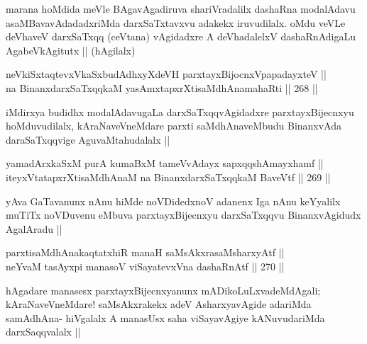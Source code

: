 \begin{artha}
marana hoMdida meVle BAgavAgadiruva shariVradalilx dashaRna modalAdavu asaMBavavAdadadxriMda darxSaTxtavxvu adakekx iruvudilalx. oMdu veVLe deVhaveV darxSaTxqq (ceVtana) vAgidadxre A deVhadalelxV dashaRnAdigaLu AgabeVkAgitutx || (hAgilalx)
\end{artha}

\begin{shl}
neVkiSxtaqtevxV\s kaSxbudAdhxyXdeVH parxtayxBijocnxVpapadayxteV || \\
na BinanxdarxSaTxqqkaM yasAmxtapxrXtisaMdhAnamahaRti ||  268 ||  
\end{shl}

\begin{artha}
iMdirxya budidhx modalAdavugaLa darxSaTxqqvAgidadxre parxtayxBijecnxyu hoMduvudilalx, kAraNaveVneMdare parxti saMdhAnaveMbudu BinanxvAda daraSaTxqqvige AguvaMtahudalalx ||
\end{artha}


\begin{shl}
yamadArxkaSxM purA kumaBxM tameVvAdayx sapxqqshAmayxhamf || \\
iteyxVtatapxrXtisaMdhAnaM na BinanxdarxSaTxqqkaM BaveVtf ||  269 ||  
\end{shl}

\begin{artha}
yAva GaTavanunx nAnu hiMde noVDidedxnoV adanenx Iga nAnu keYyalilx muTiTx noVDuvenu eMbuva parxtayxBijecnxyu darxSaTxqqvu BinanxvAgidudx AgalAradu ||  
\end{artha}


\begin{shl}
parxtisaMdhAnakaqtatxhiR manaH saMsAkxrasaMsharxyAtf ||  \\
neYvaM tasAyxpi manasoV viSayatevxVna dashaRnAtf ||  270 ||  
\end{shl}

\begin{artha}
hAgadare manasesx parxtayxBijecnxyanunx mADikoLuLxvadeMdAgali; kAraNaveVneMdare! saMsAkxrakekx adeV AsharxyavAgide adariMda samAdhAna- hiVgalalx A manasUsx saha viSayavAgiye kANuvudariMda darxSaqqvalalx ||
\end{artha}


